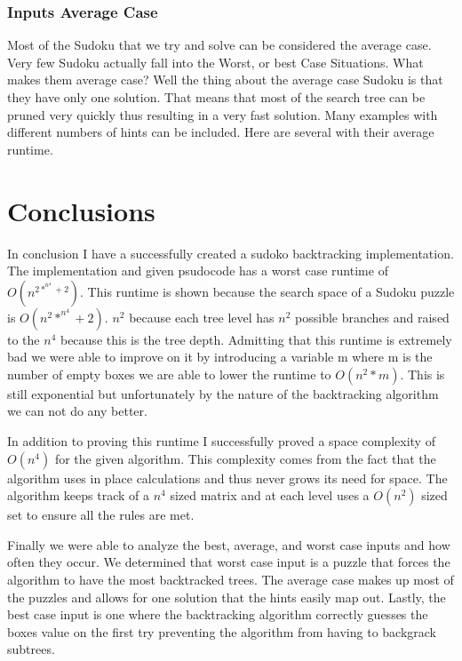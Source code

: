 \documentclass{sig-alternate}
\begin{document}
\subsubsection{Inputs Average Case}
Most of the Sudoku that we try and solve can be considered the average case. Very few Sudoku actually fall into the Worst, or best Case Situations. What makes them average case? Well the thing about the average case Sudoku is that they have only one solution. That means that most of the search tree can be pruned very quickly thus resulting in a very fast solution. Many examples with different numbers of hints can be included. Here are several with their average runtime. 


\section{Conclusions}
In conclusion I have a successfully created a sudoko backtracking implementation. The implementation and given psudocode has a worst case runtime of $O(n^{2*^{n^4} + 2})$. This runtime is shown because the search space of a Sudoku puzzle is $O(n^2*^{n^4} + 2)$. $n^2$ because each tree level has $n^2$ possible branches and raised to the $n^4$ because this is the tree depth. Admitting that this runtime is extremely bad we were able to improve on it by introducing a variable m where m is the number of empty boxes we are able to lower the runtime to $O(n^2*m)$. This is still exponential but unfortunately by the nature of the backtracking algorithm we can not do any better. 

In addition to proving this runtime I successfully proved a space complexity of $O(n^4)$ for the given algorithm. This complexity comes from the fact that the algorithm uses in place calculations and thus never grows its need for space. The algorithm keeps track of a $n^4$ sized matrix and at each level uses a $O(n^2)$ sized set to ensure all the rules are met.  

Finally we were able to analyze the best, average, and worst case inputs and how often they occur. We determined that worst case input is a puzzle that forces the algorithm to have the most backtracked trees. The average case makes up most of the puzzles and allows for one solution that the hints easily map out. Lastly, the best case input is one where the backtracking algorithm correctly guesses the boxes value on the first try preventing the algorithm from having to backgrack subtrees. 



%
\cite{*}

%
%
\end{document}
